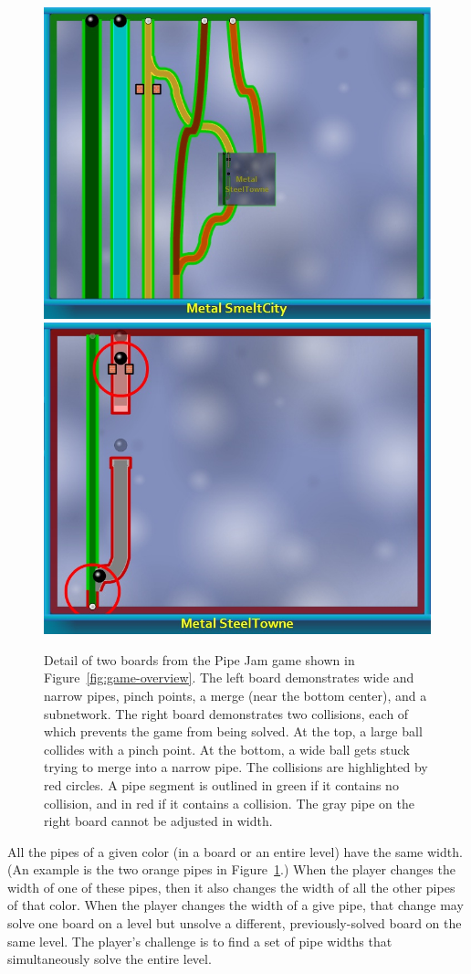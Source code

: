 \documentclass{sig-alternate}
\let\Description =\description
\def\Nospacing{\itemsep=0pt\topsep=0pt\partopsep=0pt\parskip=0pt\parsep=0pt}
\renewenvironment{description}{\Description\Nospacing}{\endlist}
\begin{document}
\begin{description}
\begin{figure}
\begin{center}
\includegraphics[width=.49\textwidth]{images/world1-subnetwork}%
\hfill%
\includegraphics[width=.49\textwidth]{images/world1-merge-and-pinch}
\end{center}
\vspace{-10pt}
\caption{
  Detail of two boards from the Pipe Jam game shown in
  Figure~\ref{fig:game-overview}.  The left board demonstrates wide and
  narrow pipes, pinch points, a merge (near the bottom center), and a
  subnetwork.  The right board demonstrates two collisions, each of which
  prevents the game from being solved.  At the top, a large ball
  collides with a pinch point.  At the bottom, a wide ball gets stuck
  trying to merge into a narrow pipe.  The collisions are highlighted by
  red circles.  A pipe segment is outlined in green if it contains  no
  collision, and in red if it contains a collision.
  The gray pipe on the right board cannot be adjusted in width.
}
\label{fig:game-detail}
\end{figure}


\item[Linked pipes]
  All the pipes of a given color (in a board or an entire level) have the
  same width.
  (An example is the two orange pipes in Figure~\ref{fig:game-detail}.)
  When the player changes the width of one of these pipes,
  then it also changes the width of all the other pipes of that color.
  When the player changes the width of a give pipe, that change may solve
  one board on a level but unsolve a different, previously-solved board on
  the same level.  The player's challenge is to find a set of pipe widths
  that simultaneously solve the entire level.


\end{description}
\end{document}
